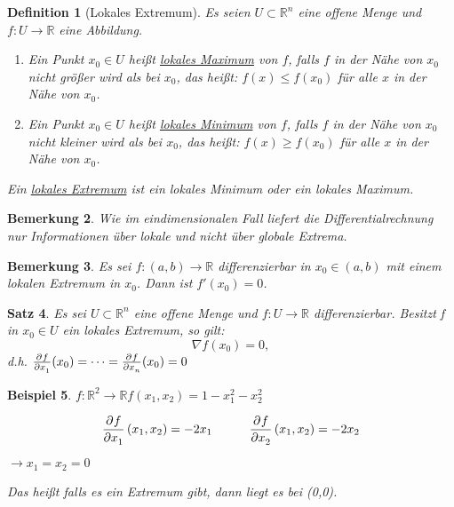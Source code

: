\documentclass[fontset=ubuntu,12pt,a4paper]{scrreprt}
\newtheorem{defi}{Definition}[section]
\newtheorem{bemerkung}[defi]{Bemerkung}
\newtheorem{beispiel}[defi]{Beispiel}
\newtheorem{satz}[defi]{Satz}
\begin{document}
\begin{defi}[Lokales Extremum]
    Es seien \(U\subset\mathbb{R}^n\) eine offene Menge und \(f:U\to\mathbb{R}\) eine Abbildung.
    \begin{enumerate}[label=\emph{(\roman*)}]
        \item Ein Punkt \(x_0\in U\) heißt \underline{lokales Maximum} von \(f\), falls \(f\) in der Nähe von \(x_0\) nicht größer wird als bei \(x_0\), das heißt:
        \(f(x)\le f(x_0)\) für alle \(x\) in der Nähe von \(x_0\).
        \item Ein Punkt \(x_0\in U\) heißt \underline{lokales Minimum} von \(f\), falls \(f\) in der Nähe von \(x_0\) nicht kleiner wird als bei \(x_0\), das heißt:
        \(f(x)\ge f(x_0) \) für alle \(x\) in der Nähe von \(x_0\).
    \end{enumerate}
    Ein \underline{lokales Extremum} ist ein lokales Minimum oder ein lokales Maximum.
\end{defi}

\begin{bemerkung}
    Wie im eindimensionalen Fall liefert die Differentialrechnung nur Informationen über lokale und nicht über globale Extrema.
\end{bemerkung}

\begin{bemerkung}
    Es sei \(f:(a,b)\to\mathbb{R}\) differenzierbar in \(x_0\in (a,b)\) mit einem lokalen Extremum in \(x_0\). Dann ist \(f'(x_0)=0\).
\end{bemerkung}

\begin{satz}
    Es sei \(U \subset \mathbb{R}^n\) eine offene Menge und \(f:U\to\mathbb{R}\) differenzierbar. Besitzt f in \(x_0\in U\) ein lokales Extremum, so gilt:
    \[\nabla f(x_0)=0,\]
    d.h. \(\pd{f}{x_1}(x_0)=\cdots=\pd{f}{x_n}(x_0)=0\)
\end{satz}

\begin{beispiel}
    \(f:\mathbb{R}^2\to\mathbb{R}\)\hspace{1cm}\(f(x_1,x_2)=1-x_1^2-x_2^2\)
    
    \[\dpd{f}{x_1}(x_1,x_2)=-2x_1\hspace{1cm}\dpd{f}{x_2}(x_1,x_2)=-2x_2\]
    
    \(\to x_1=x_2=0\)
    
    Das heißt falls es ein Extremum gibt, dann liegt es bei (0,0).
\end{beispiel}
\end{document}
